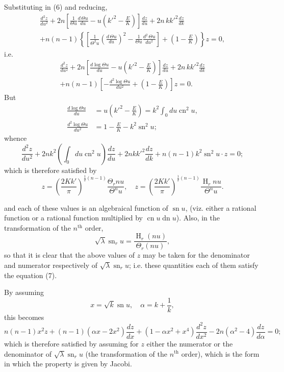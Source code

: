 \documentclass[12pt,a4paper]{article}
\theoremstyle{plain}
\DeclareMathOperator{\sn}{sn}
\DeclareMathOperator{\cn}{cn}
\DeclareMathOperator{\dn}{dn}
\DeclareMathOperator{\Hf}{H}
\begin{document}
Substituting in (6) and reducing,
\begin{multline*}
\frac{d^2 z}{du^2} + 2n \left[\frac{1}{\Theta u} \frac{d\,\Theta u}{du} - u\left(k'^2 - \frac{E}{K}\right)\right] \frac{dz}{du} + 2n\, kk'^2 \frac{dz}{dk} \\
+ n(n-1) \left\{\left[\frac{1}{\Theta^2 u}\left(\frac{d\,\Theta u}{du}\right)^2 - \frac{1}{\Theta u} \frac{d^2\,\Theta u}{du^2}\right] + \left(1 - \frac{E}{K}\right)\right\} z = 0,
\end{multline*}
i.e.
\begin{multline*}
\frac{d^2 z}{du^2} + 2n \left[\frac{d\log\Theta u}{du} - u\left(k'^2 - \frac{E}{K}\right)\right] \frac{dz}{du} + 2n\, kk'^2 \frac{dz}{dk} \\
+ n(n-1) \left[-\frac{d^2\log\Theta u}{du^2} + \left(1 - \frac{E}{K}\right)\right] z = 0.
\end{multline*}
But
\begin{align*}
\frac{d\log\Theta u}{du} &= u\left(k'^2 - \frac{E}{K}\right) = k^2 \int_0 du \cn^2 u, \\
\frac{d^2\log\Theta u}{du^2} &= 1 - \frac{E}{K} - k^2 \sn^2 u;
\end{align*}
whence
\[
\frac{d^2 z}{du^2} + 2nk^2 \left(\int_0 du \cn^2 u\right) \frac{dz}{du} + 2nkk'^2 \frac{dz}{dk} + n(n-1)k^2 \sn^2 u \cdot z = 0 \tag{7};
\]
which is therefore satisfied by
\[
z = \left(\frac{2Kk'}{\pi}\right)^{\frac{1}{2}(n-1)} \frac{\Theta_r nu}{\Theta^n u}, \quad z = \left(\frac{2Kk'}{\pi}\right)^{\frac{1}{2}(n-1)} \frac{\Hf_r nu}{\Theta^n u}.
\]


and each of these values is an algebraical function of $\sn u$, (viz. either a rational function or a rational function multiplied by $\cn u \dn u$). Also, in the transformation of the $n^{\text{th}}$ order,
\[
\sqrt{\lambda} \sn_r u = \frac{\Hf_r(nu)}{\Theta_r(nu)},
\]
so that it is clear that the above values of $z$ may be taken for the denominator and numerator respectively of $\sqrt{\lambda} \sn_r u$; i.e. these quantities each of them satisfy the equation (7).

By assuming
\[
x = \sqrt{k} \sn u, \quad \alpha = k + \frac{1}{k},
\]
this becomes
\[
n(n-1)x^2 z + (n-1)(\alpha x - 2x^2)\frac{dz}{dx} + (1 - \alpha x^2 + x^4)\frac{d^2 z}{dx^2} - 2n(\alpha^2 - 4)\frac{dz}{d\alpha} = 0 \tag{8};
\]
which is therefore satisfied by assuming for $z$ either the numerator or the denominator of $\sqrt{\lambda} \sn_r u$ (the transformation of the $n^{\text{th}}$ order), which is the form in which the property is given by Jacobi.
\end{document}
